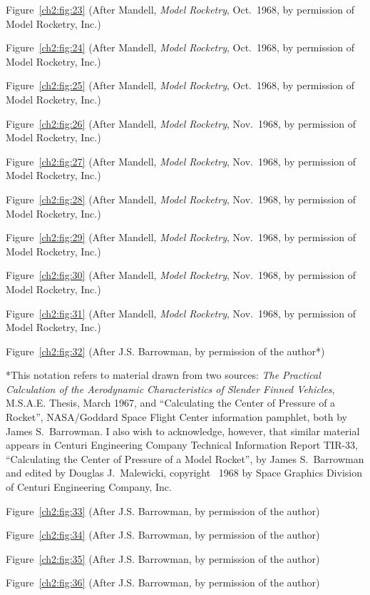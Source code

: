 Figure~\ref{ch2:fig:23} (After Mandell, \emph{Model Rocketry}, Oct.~1968, by permission
of Model Rocketry, Inc.)

Figure~\ref{ch2:fig:24} (After Mandell, \emph{Model Rocketry}, Oct.~1968, by permission
of Model Rocketry, Inc.)

Figure~\ref{ch2:fig:25} (After Mandell, \emph{Model Rocketry}, Oct.~1968, by permission
of Model Rocketry, Inc.)

Figure~\ref{ch2:fig:26} (After Mandell, \emph{Model Rocketry}, Nov.~1968, by permission
of Model Rocketry, Inc.)

Figure~\ref{ch2:fig:27} (After Mandell, \emph{Model Rocketry}, Nov.~1968, by permission
of Model Rocketry, Inc.)

Figure~\ref{ch2:fig:28} (After Mandell, \emph{Model Rocketry}, Nov.~1968, by permission
of Model Rocketry, Inc.)

Figure~\ref{ch2:fig:29} (After Mandell, \emph{Model Rocketry}, Nov.~1968, by permission
of Model Rocketry, Inc.)

Figure~\ref{ch2:fig:30} (After Mandell, \emph{Model Rocketry}, Nov.~1968, by permission
of Model Rocketry, Inc.)

Figure~\ref{ch2:fig:31} (After Mandell, \emph{Model Rocketry}, Nov.~1968, by permission
of Model Rocketry, Inc.)

Figure~\ref{ch2:fig:32} (After J.S. Barrowman, by permission of the author*)

*This notation refers to material drawn from two sources: \emph{The Practical Calculation
of the Aerodynamic Characteristics of Slender Finned Vehicles}, M.S.A.E. Thesis, March 1967,
and ``Calculating the Center of Pressure of a Rocket'', NASA/Goddard Space Flight Center
information pamphlet, both by James S.~Barrowman. I also wish to acknowledge, however, that
similar material appears in Centuri Engineering Company Technical Information Report TIR-33,
``Calculating the Center of Pressure of a Model Rocket'', by James S.~Barrowman and edited by
Douglas J.~Malewicki, copyright \textcopyright~1968 by Space Graphics Division of Centuri
Engineering Company, Inc.

Figure~\ref{ch2:fig:33} (After J.S. Barrowman, by permission of the author)

Figure~\ref{ch2:fig:34} (After J.S. Barrowman, by permission of the author)

Figure~\ref{ch2:fig:35} (After J.S. Barrowman, by permission of the author)

Figure~\ref{ch2:fig:36} (After J.S. Barrowman, by permission of the author)

